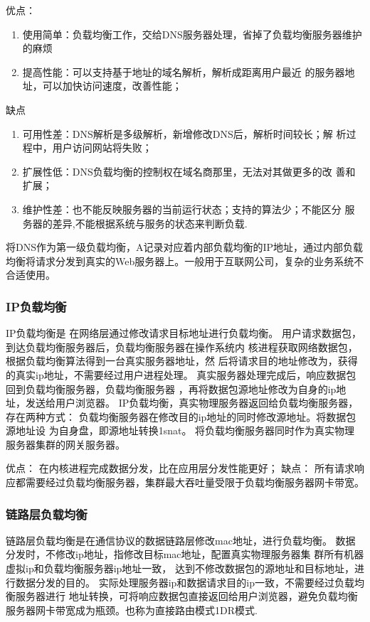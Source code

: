\noindent
优点：
\begin{enumerate}
	\item 使用简单：负载均衡工作，交给DNS服务器处理，省掉了负载均衡服务器维护的麻烦
	\item 提高性能：可以支持基于地址的域名解析，解析成距离用户最近
	的服务器地址，可以加快访问速度，改善性能；
\end{enumerate}

\noindent
缺点
\begin{enumerate}
	\item 可用性差：DNS解析是多级解析，新增修改DNS后，解析时间较长；解
	析过程中，用户访问网站将失败；
	\item 扩展性低：DNS负载均衡的控制权在域名商那里，无法对其做更多的改
	善和扩展；
	\item 维护性差：也不能反映服务器的当前运行状态；支持的算法少；不能区分
	服务器的差异,不能根据系统与服务的状态来判断负载.
\end{enumerate}

将DNS作为第一级负载均衡，A记录对应着内部负载均衡的IP地址，通过内部负载
均衡将请求分发到真实的Web服务器上。一般用于互联网公司，复杂的业务系统不合适使用。
\subsubsection{IP负载均衡}
IP负载均衡是
在网络层通过修改请求目标地址进行负载均衡。
用户请求数据包，到达负载均衡服务器后，负载均衡服务器在操作系统内
核进程获取网络数据包，根据负载均衡算法得到一台真实服务器地址，然
后将请求目的地址修改为，获得的真实ip地址，不需要经过用户进程处理。
真实服务器处理完成后，响应数据包回到负载均衡服务器，负载均衡服务器
，再将数据包源地址修改为自身的ip地址，发送给用户浏览器。
IP负载均衡，真实物理服务器返回给负载均衡服务器，存在两种方式：
负载均衡服务器在修改目的ip地址的同时修改源地址。将数据包源地址设
为自身盘，即源地址转换1snat。
将负载均衡服务器同时作为真实物理服务器集群的网关服务器。

优点：
	在内核进程完成数据分发，比在应用层分发性能更好；
缺点：
所有请求响应都需要经过负载均衡服务器，集群最大吞吐量受限于负载均衡服务器网卡带宽。
\subsubsection{链路层负载均衡}
链路层负载均衡是在通信协议的数据链路层修改mac地址，进行负载均衡。
数据分发时，不修改ip地址，指修改目标mac地址，配置真实物理服务器集
群所有机器虚拟ip和负载均衡服务器ip地址一致，
达到不修改数据包的源地址和目标地址，进行数据分发的目的。
实际处理服务器ip和数据请求目的ip一致，不需要经过负载均衡服务器进行
地址转换，可将响应数据包直接返回给用户浏览器，避免负载均衡
服务器网卡带宽成为瓶颈。也称为直接路由模式1DR模式.


